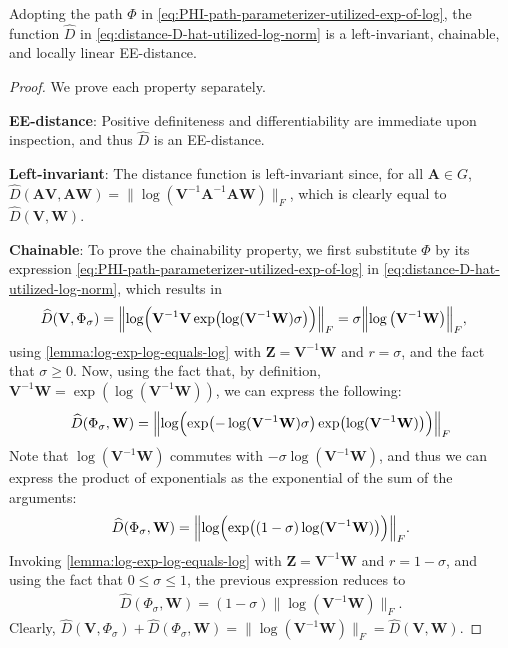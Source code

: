 \begin{proposition}
    Adopting the path $\Phi$ in \eqref{eq:PHI-path-parameterizer-utilized-exp-of-log}, the function $\widehat{D}$ in \eqref{eq:distance-D-hat-utilized-log-norm} is a left-invariant, chainable, and locally linear EE-distance.
\end{proposition}
\begin{proof}
    We prove each property separately. 
    
    \textbf{EE-distance}: Positive definiteness and differentiability are immediate upon inspection, and thus $\widehat{D}$ is an EE-distance.
    
    \textbf{Left-invariant}: The distance function is left-invariant since, for all $\mathbf{A} \in G$, $\widehat{D}(\mathbf{A}\mathbf{V}, \mathbf{A}\mathbf{W}) =  \|\log{(\mathbf{V}^{-1}\mathbf{A}^{-1}\mathbf{A}\mathbf{W})}\|_F$, which is clearly equal to $\widehat{D}(\mathbf{V}, \mathbf{W})$.

    \textbf{Chainable}: To prove the chainability property, we first substitute $\Phi$ by its expression \eqref{eq:PHI-path-parameterizer-utilized-exp-of-log} in \eqref{eq:distance-D-hat-utilized-log-norm}, which results in
    \begin{align}
             \widehat{D}(\mathbf{V}, \Phi_\sigma) &= \Bigl\|\log\Bigl(\mathbf{V}^{-1}\mathbf{V}\exp\bigl(\log(\mathbf{V}^{-1}\mathbf{W})\sigma\bigr)\Bigr)\Bigr\|_F
             =\sigma\Bigl\|\log{\left(\mathbf{V}^{-1}\mathbf{W}\right)}\Bigr\|_F,
    \end{align}
    using \cref{lemma:log-exp-log-equals-log} with $\mathbf{Z}=\mathbf{V}^{-1}\mathbf{W}$ and $r=\sigma$, and the fact that $\sigma\ge0$. Now, using the fact that, by definition, $\mathbf{V}^{-1}\mathbf{W}=\exp(\log(\mathbf{V}^{-1}\mathbf{W}))$, we can express the following:
    \begin{align}
             \widehat{D}(\Phi_\sigma, \mathbf{W}) = \Bigl\|\log\Bigl(\exp\bigl(-\log(\mathbf{V}^{-1}\mathbf{W})\sigma\bigr)\exp\bigl(\log(\mathbf{V}^{-1}\mathbf{W})\bigr)\Bigr)\Bigr\|_F
    \end{align}
    Note that $\log(\mathbf{V}^{-1}\mathbf{W})$ commutes with $-\sigma\log(\mathbf{V}^{-1}\mathbf{W})$, and thus we can express the product of exponentials as the exponential of the sum of the arguments:
    \begin{align}
        \widehat{D}(\Phi_\sigma, \mathbf{W}) = \Bigl\|\log\Bigl(\exp\bigl((1-\sigma)\log(\mathbf{V}^{-1}\mathbf{W})\bigr)\Bigr)\Bigr\|_F.
    \end{align}
    Invoking \cref{lemma:log-exp-log-equals-log} with $\mathbf{Z}=\mathbf{V}^{-1}\mathbf{W}$ and $r=1-\sigma$, and using the fact that $0\le\sigma\le1$, the previous expression reduces to 
    \begin{align}
       \widehat{D}(\Phi_\sigma, \mathbf{W}) =(1-\sigma)\|\log{\left(\mathbf{V}^{-1}\mathbf{W}\right)}\|_F.
    \end{align}
    Clearly, $\widehat{D}(\mathbf{V}, \Phi_\sigma) + \widehat{D}(\Phi_\sigma, \mathbf{W}) = \|\log(\mathbf{V}^{-1}\mathbf{W})\|_F = \widehat{D}(\mathbf{V}, \mathbf{W})$. 
    

\end{proof}
